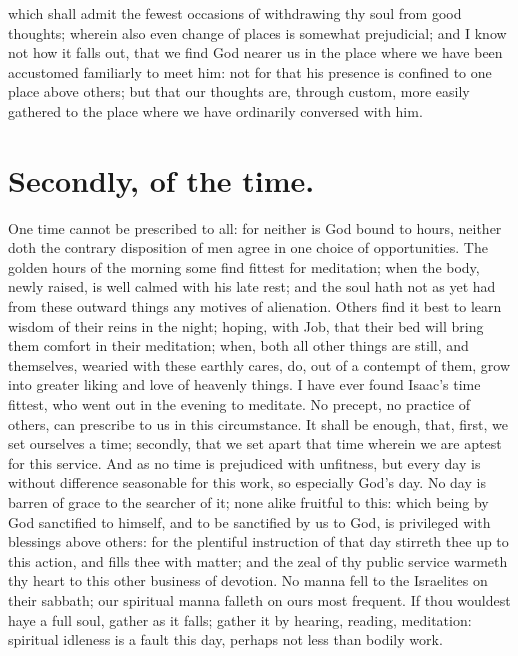 which shall admit the fewest occasions of withdrawing thy soul from good thoughts; wherein also even change of places is somewhat prejudicial; and I know not how it falls out, that we find God nearer us in the place where we have been accustomed familiarly to meet him: not for that his presence is confined to one place above others; but that our thoughts are, through custom, more easily gathered to the place where we have ordinarily conversed with him. 

\section{Secondly, of the time.}
One time cannot be prescribed to all: for neither is God bound to hours, neither doth the contrary disposition of men agree in one choice of opportunities. The golden hours of the morning some find fittest for meditation; when the body, newly raised, is well calmed with his late rest; and the soul hath not as yet had from these outward things any motives of alienation. Others find it best to learn wisdom of their reins in the night; hoping, with Job, that their bed will bring them comfort in their meditation; when, both all other things are still, and themselves, wearied with these earthly cares, do, out of a contempt of them, grow into greater liking and love of heavenly things. I have ever found Isaac's time fittest, who went out in the evening to meditate. No precept, no practice of others, can prescribe to us in this circumstance. It shall be enough, that, first, we set ourselves a time; secondly, that we set apart that time wherein we are aptest for this service. And as no time is prejudiced with unfitness, but every day is without difference seasonable for this work, so especially God's day. No day is barren of grace to the searcher of it; none alike fruitful to this: which being by God sanctified to himself, and to be sanctified by us to God, is privileged with blessings above others: for the plentiful instruction of that day stirreth thee up to this action, and fills thee with matter; and the zeal of thy public service warmeth thy heart to this other business of devotion. No manna fell to the Israelites on their sabbath; our spiritual manna falleth on ours most frequent. If thou wouldest haye a full soul, gather as it falls; gather it by hearing, reading, meditation: spiritual idleness is a fault this day, perhaps not less than bodily work. 

